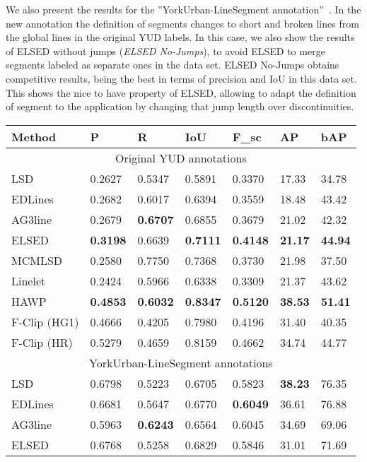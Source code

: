 \documentclass[preprint,12pt]{elsarticle}
\begin{document}
We also present the results for the ''YorkUrban-LineSegment annotation''~\cite{cho2017novel}. 
In the new annotation the definition of segments changes to short and broken lines from the global lines in the original YUD labels. In this case, we also show the results of ELSED without jumps (\emph{ELSED No-Jumps}), to avoid ELSED to merge segments labeled as separate ones in the data set. ELSED No-Jumps obtains competitive results, being the best in terms of precision and IoU in this data set. This shows the nice to have property of ELSED, allowing to adapt the definition of segment to the application by changing that jump length over discontinuities.

\begin{table}
\centering


\begin{tabular}{|l||l|l|l|l||l|l|} \hline
Method & P & R & IoU & F\_sc & AP & bAP \\ \hline
\multicolumn{7}{|c|}{Original YUD annotations} \\ \hline
LSD & 0.2627 & 0.5347 & 0.5891 & 0.3370     & 17.33 & 34.78\\
EDLines & 0.2682 & 0.6017 & 0.6394 & 0.3559 & 18.48 & 43.42\\
AG3line & 0.2679 & \textbf{0.6707} & 0.6855 & 0.3679 & 21.02 & 42.32\\
ELSED & \textbf{0.3198} & 0.6639 & \textbf{0.7111} & \textbf{0.4148} & \textbf{21.17} & \textbf{44.94} \\ \hline
MCMLSD & 0.2580 & 0.7750 & 0.7368 & 0.3730 & 21.98 & 37.50\\
Linelet & 0.2424 & 0.5966 & 0.6338 & 0.3309 & 21.37 & 43.62\\
HAWP & \textbf{0.4853} & \textbf{0.6032} & \textbf{0.8347} & \textbf{0.5120} & \textbf{38.53} & \textbf{51.41}\\
F-Clip (HG1) & 0.4666 & 0.4205 & 0.7980 & 0.4196 & 31.40 & 40.35 \\
F-Clip (HR) & 0.5279 & 0.4659 & 0.8159 & 0.4662 & 34.74 & 44.77 \\
\hline \hline 
\multicolumn{7}{|c|}{YorkUrban-LineSegment annotations} \\ \hline
LSD     & 0.6798 & 0.5223 & 0.6705 & 0.5823 & \textbf{38.23} & 76.35 \\
EDLines & 0.6681 & 0.5647 & 0.6770 & \textbf{0.6049} & 36.61 & 76.88 \\
AG3line & 0.5963 & \textbf{0.6243} & 0.6564 & 0.6045 & 34.69 & 69.06 \\
ELSED   & 0.6768 & 0.5258 & 0.6829 & 0.5846 & 31.01 & 71.69 \\

\end{tabular}
\end{table}
\end{document}
